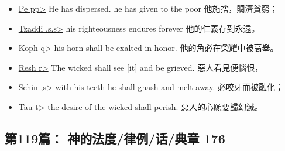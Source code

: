 \begin{itemize}
\item \underline{Pe \<pp>} He has dispersed. he has given to the poor 他施捨，賙濟貧窮；
\item \underline{Tzaddi \<.s.s>} his righteousness endures forever 他的仁義存到永遠。
\item \underline{Koph \<q>} his horn shall be exalted in honor. 他的角必在榮耀中被高舉。
\item \underline{Resh  \<r>} The wicked shall see [it] and be grieved. 惡人看見便惱恨，
\item \underline{Schin \<,s>} with his teeth he shall gnash and melt away. 必咬牙而被融化；
\item \underline{Tau \<t>} the desire of the wicked shall perish. 惡人的心願要歸幻滅。
\end{itemize}

\subsection{第119篇： 神的法度/律例/话/典章 176}













